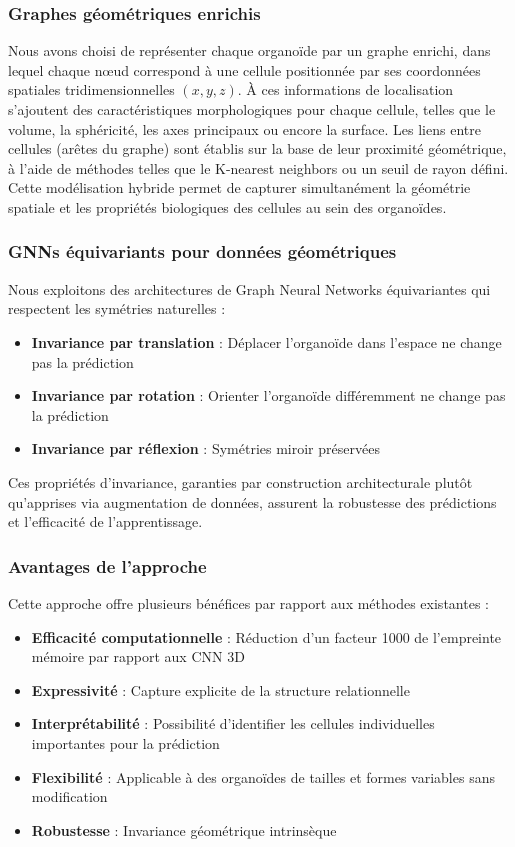 \subsubsection{Graphes géométriques enrichis}

Nous avons choisi de représenter chaque organoïde par un graphe enrichi, dans lequel chaque nœud correspond à une cellule positionnée par ses coordonnées spatiales tridimensionnelles $(x, y, z)$. À ces informations de localisation s’ajoutent des caractéristiques morphologiques pour chaque cellule, telles que le volume, la sphéricité, les axes principaux ou encore la surface. Les liens entre cellules (arêtes du graphe) sont établis sur la base de leur proximité géométrique, à l’aide de méthodes telles que le K-nearest neighbors ou un seuil de rayon défini. Cette modélisation hybride permet de capturer simultanément la géométrie spatiale et les propriétés biologiques des cellules au sein des organoïdes.

\subsubsection{GNNs équivariants pour données géométriques}

Nous exploitons des architectures de Graph Neural Networks équivariantes qui respectent les symétries naturelles :
\begin{itemize}
    \item \textbf{Invariance par translation} : Déplacer l'organoïde dans l'espace ne change pas la prédiction
    \item \textbf{Invariance par rotation} : Orienter l'organoïde différemment ne change pas la prédiction
    \item \textbf{Invariance par réflexion} : Symétries miroir préservées
\end{itemize}

Ces propriétés d'invariance, garanties par construction architecturale plutôt qu'apprises via augmentation de données, assurent la robustesse des prédictions et l'efficacité de l'apprentissage.

\subsubsection{Avantages de l'approche}

Cette approche offre plusieurs bénéfices par rapport aux méthodes existantes :
\begin{itemize}
    \item \textbf{Efficacité computationnelle} : Réduction d'un facteur 1000 de l'empreinte mémoire par rapport aux CNN 3D
    \item \textbf{Expressivité} : Capture explicite de la structure relationnelle
    \item \textbf{Interprétabilité} : Possibilité d'identifier les cellules individuelles importantes pour la prédiction
    \item \textbf{Flexibilité} : Applicable à des organoïdes de tailles et formes variables sans modification
    \item \textbf{Robustesse} : Invariance géométrique intrinsèque
\end{itemize}

